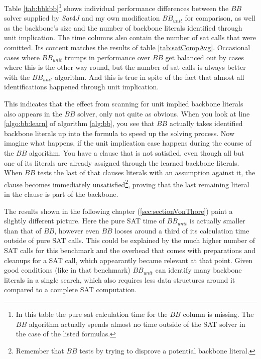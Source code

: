 Table \ref{tab:bbkbb}\footnote{In this table the pure sat calculation time for the $BB$ column is missing. The $BB$ algorithm actually spends almost no time outside of the SAT solver in the case of the listed formulas.
	} 
shows individual performance differences between the $BB$ solver supplied by $Sat4J$ and my own modification $BB_{unit}$ for comparison, as well as the backbone's size and the number of backbone literals identified through unit implication. The time columns also contain the number of sat calls that were comitted. Its content matches the results of table \ref{tab:satCompAvg}. Occasional cases where $BB_{unit}$ trumps in performance over $BB$ get balanced out by cases where this is the other way round, but the number of sat calls is always better with the $BB_{unit}$ algorithm. And this is true in spite of the fact that almost all identifications happened through unit implication. 

This indicates that the effect from scanning for unit implied backbone literals also appears in the $BB$ solver, only not quite as obvious. When you look at line \ref{algo:bb:learn} of algorithm \ref{alg:bb}, you see that $BB$ actually takes identified backbone literals up into the formula to speed up the solving process. Now imagine what happens, if the unit implication case happens during the course of the $BB$ algorithm. You have a clause that is not satisfied, even though all but one of its literals are already assigned through the learned backbone literals. When $BB$ tests the last of that clauses literals with an assumption against it, the clause becomes immediately unsatisfied\footnote{Remember that $BB$ tests by trying to disprove a potential backbone literal.}, proving that the last remaining literal in the clause is part of the backbone. 

The results shown in the following chapter (\ref{sec:sectionVonThore}) paint a slightly different picture. Here the pure SAT time of $BB_{unit}$ is actually smaller than that of $BB$, however even $BB$ looses around a third of its calculation time outside of pure SAT calls. This could be explained by the much higher number of SAT calls for this benchmark and the overhead that comes with preparations and cleanups for a SAT call, which appearantly became relevant at that point. Given good conditions (like in that benchmark) $BB_{unit}$ can identify many backbone literals in a single search, which also requires less data structures around it compared to a complete SAT computation.

